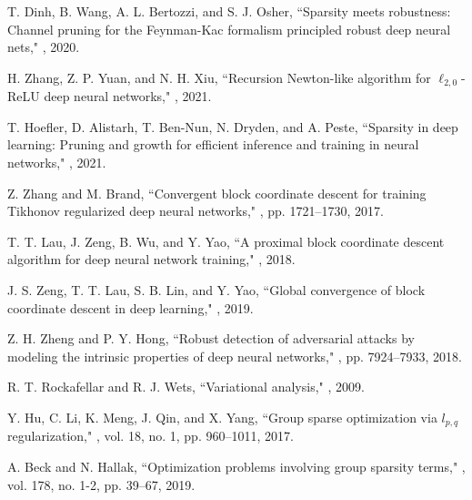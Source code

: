 \documentclass[journal]{IEEEtran}
\begin{document}
\begin{thebibliography}{99}
T. Dinh, B. Wang, A. L. Bertozzi, and S. J. Osher,
\newblock  ``Sparsity meets robustness: Channel pruning for the Feynman-Kac formalism principled robust deep neural nets,"
, 2020.


H. Zhang, Z. P. Yuan, and N. H. Xiu,
\newblock  ``Recursion Newton-like algorithm for $\ell_{2,0}$-ReLU deep neural networks,"
, 2021.



T. Hoefler, D. Alistarh, T. Ben-Nun, N. Dryden, and A. Peste,
\newblock  ``Sparsity in deep learning: Pruning and growth for efficient inference and training in neural networks,"
, 2021.


Z. Zhang and M. Brand,
\newblock  ``Convergent block coordinate descent for training Tikhonov regularized  deep neural networks,"
, pp. 1721--1730, 2017.


T. T. Lau, J. Zeng, B. Wu, and Y. Yao,
\newblock  ``A proximal block coordinate descent algorithm for deep neural network  training,"
, 2018.


J. S. Zeng, T. T. Lau, S. B. Lin, and Y. Yao,
\newblock  ``Global convergence of block coordinate descent in deep learning,"
, 2019.


Z. H. Zheng and P. Y. Hong,
\newblock  ``Robust detection of adversarial attacks by modeling the intrinsic properties of deep neural networks,"
, pp. 7924--7933, 2018.


R. T. Rockafellar and R. J. Wets,
\newblock  ``Variational analysis,"
, 2009.


Y. Hu, C. Li, K. Meng, J. Qin, and X. Yang,
\newblock  ``Group sparse optimization via $l_{p,q}$ regularization,"
,
\newblock vol. 18, no. 1, pp. 960--1011, 2017.


A. Beck and N. Hallak,
\newblock  ``Optimization problems involving group sparsity terms,"
,
\newblock vol. 178, no. 1-2, pp. 39--67, 2019.








\end{thebibliography}
\end{document}
